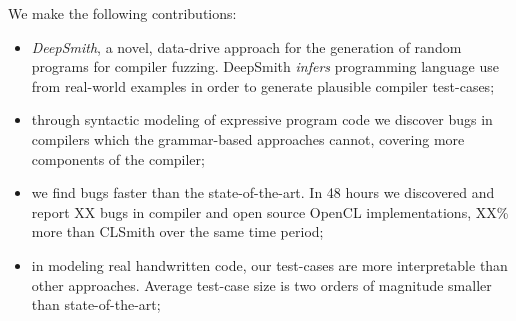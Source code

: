 We make the following contributions:
%
\begin{itemize}
\item \emph{DeepSmith}, a novel, data-drive approach for the generation of random programs for compiler fuzzing. DeepSmith \emph{infers} programming language use from real-world examples in order to generate plausible compiler test-cases; %
\item through syntactic modeling of expressive program code we discover bugs in compilers which the grammar-based approaches cannot, covering more components of the compiler;
\item we find bugs faster than the state-of-the-art. In 48 hours we discovered and report XX bugs in compiler and open source OpenCL implementations, XX\% more than CLSmith over the same time period;
\item in modeling real handwritten code, our test-cases are more interpretable than other approaches. Average test-case size is two orders of magnitude smaller than state-of-the-art;
\end{itemize}
